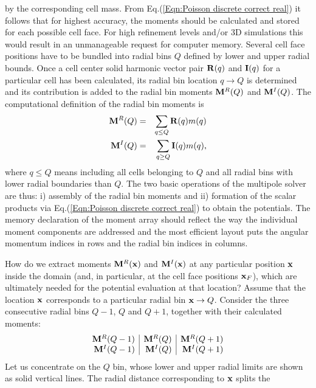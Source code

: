 by the corresponding cell mass. From Eq.(\ref{Eqn:Poisson discrete correct real}) it follows that
for highest accuracy, the moments should be calculated and stored for each possible cell face.
For high refinement levels and/or 3D simulations this would result in an unmanageable request
for computer memory. Several cell face positions have to be bundled into radial bins $Q$ defined
by lower and upper radial bounds. Once a cell center solid harmonic vector pair ${\bf R}(q)$ and
${\bf I}(q)$ for a particular cell has been calculated, its radial bin location $q\rightarrow Q$
is determined and its contribution is added to the radial bin moments ${\bf M}^R(Q)$ and ${\bf M}^I(Q)$.
The computational definition of the radial bin moments is
\begin{eqnarray}
\label{Eqn:Moment computational definition}
{\bf M}^R(Q) & = & \sum_{q\leq Q}{\bf R}(q)m(q) \\
{\bf M}^I(Q) & = & \sum_{q\geq Q}{\bf I}(q)m(q),
\end{eqnarray}
where $q\leq Q$ means including all cells belonging to $Q$ and all radial bins
with lower radial boundaries than $Q$. The two basic operations of the multipole solver
are thus: i) assembly of the radial bin moments and ii) formation of the scalar
products via Eq.(\ref{Eqn:Poisson discrete correct real}) to obtain the potentials.
The memory declaration of the moment array should reflect the way the individual
moment components are addressed and the most efficient layout puts the angular momentum
indices in rows and the radial bin indices in columns.
\par
How do we extract moments ${\bf M}^R({\bf x})$ and ${\bf M}^I({\bf x})$ at any particular position
${\bf x}$ inside the domain (and, in particular, at the cell face positions ${\bf x}_F$), which are
ultimately needed for the potential evaluation at that location? Assume that the location
${\bf x}$ corresponds to a particular radial bin ${\bf x}\rightarrow Q$. Consider the
three consecutive radial bins $Q-1$, $Q$ and $Q+1$, together with their calculated moments:
\begin{equation}
\begin{array}{r|r|r}
{\bf M}^R(Q-1) & {\bf M}^R(Q) & {\bf M}^R(Q+1) \\
{\bf M}^I(Q-1) & {\bf M}^I(Q) & {\bf M}^I(Q+1)
\end{array}
\end{equation}
Let us concentrate on the $Q$ bin, whose lower and upper radial limits are shown
as solid vertical lines. The radial distance corresponding to ${\bf x}$ splits the
